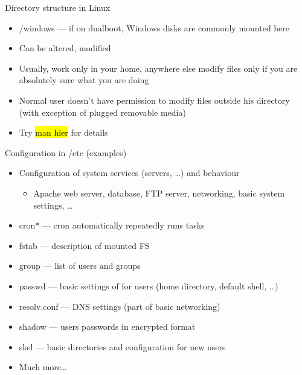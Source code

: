 \documentclass[compress, ucs, xelatex, 11pt, xcolor=svgnames,
  hyperref={
    bookmarks=true,
    unicode=true,
    colorlinks=true,
    pdftitle={Linux, command line and MetaCentrum},
    plainpages=false,
    pdfauthor={Vojtech Zeisek},
    pdfsubject={Course about use of Linux command line, writing shell scripts and using MetaCentrum of CESNET},
    pdfcreator={XeLaTeX, http://www.xelatex.org/},
    pdfkeywords={Linux, GNU, BASH, shell, command line, MetaCentrum},
    linkcolor=Sienna,
    anchorcolor=black,
    citecolor=green,
    filecolor=magenta,
    menucolor=Sienna,
    urlcolor=cyan,
    pdftex},
  url={hyphens, lowtilde} %
  ]{beamer}
\renewcommand{\texttt}[1]{\hl{\ttfamily #1}}
\begin{document}
\begin{frame}[allowframebreaks]{Directory structure in Linux}
\begin{itemize}
  \item \alert{/windows} --- if on dualboot, Windows disks are commonly mounted here
  \item Can be altered, modified
  \item Usually, work only in your home, anywhere else modify files only if you are absolutely sure what you are doing
  \item Normal user doesn't have permission to modify files outside his directory (with exception of plugged removable media)
  \item Try \texttt{man hier} for details
\end{itemize}
\end{frame}

\begin{frame}{Configuration in /etc (examples)}
\begin{itemize}
  \item Configuration of system services (servers, \ldots) and behaviour
  \begin{itemize}
    \item Apache web server, database, FTP server, networking, basic system settings, \ldots
  \end{itemize}
  \item cron* --- cron automatically repeatedly runs tasks
  \item fstab --- description of mounted FS
  \item group --- list of users and groups
  \item passwd --- basic settings of for users (home directory, default shell, \ldots)
  \item resolv.conf ---  DNS settings (part of basic networking)
  \item shadow --- users passwords in encrypted format
  \item skel --- basic directories and configuration for new users
  \item Much more\ldots
\end{itemize}
\end{frame}
\end{document}
